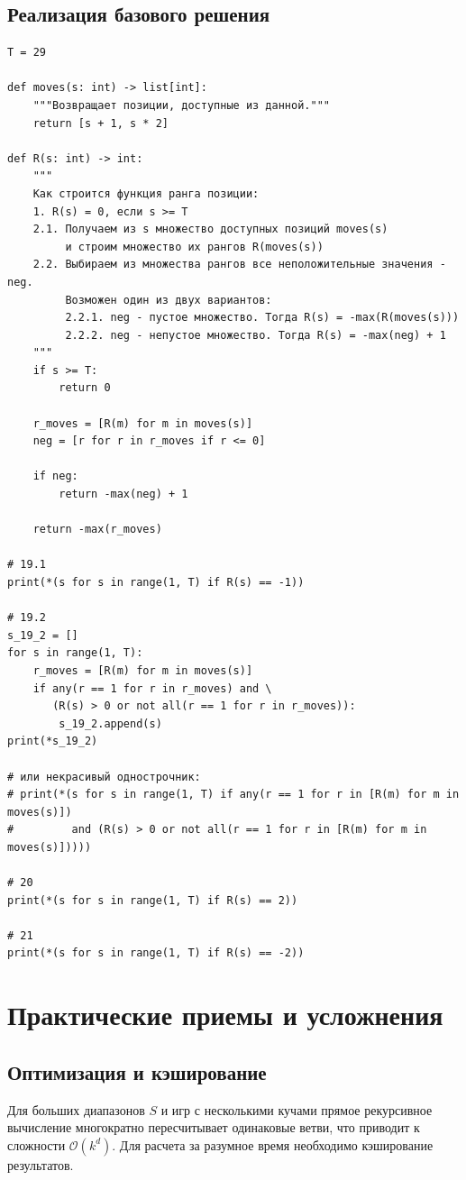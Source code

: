 \documentclass[11pt,a4paper]{article}
\begin{document}
\subsection{Реализация базового решения}
\begin{verbatim}
T = 29

def moves(s: int) -> list[int]:
    """Возвращает позиции, доступные из данной."""
    return [s + 1, s * 2]

def R(s: int) -> int:
    """
    Как строится функция ранга позиции:
    1. R(s) = 0, если s >= T
    2.1. Получаем из s множество доступных позиций moves(s) 
         и строим множество их рангов R(moves(s))
    2.2. Выбираем из множества рангов все неположительные значения - neg. 
         Возможен один из двух вариантов:
         2.2.1. neg - пустое множество. Тогда R(s) = -max(R(moves(s)))
         2.2.2. neg - непустое множество. Тогда R(s) = -max(neg) + 1
    """
    if s >= T:
        return 0

    r_moves = [R(m) for m in moves(s)]
    neg = [r for r in r_moves if r <= 0]

    if neg:
        return -max(neg) + 1

    return -max(r_moves)

# 19.1
print(*(s for s in range(1, T) if R(s) == -1))

# 19.2
s_19_2 = []
for s in range(1, T):
    r_moves = [R(m) for m in moves(s)]
    if any(r == 1 for r in r_moves) and \
       (R(s) > 0 or not all(r == 1 for r in r_moves)):
        s_19_2.append(s)
print(*s_19_2)

# или некрасивый однострочник:
# print(*(s for s in range(1, T) if any(r == 1 for r in [R(m) for m in moves(s)]) 
#         and (R(s) > 0 or not all(r == 1 for r in [R(m) for m in moves(s)]))))

# 20
print(*(s for s in range(1, T) if R(s) == 2))

# 21
print(*(s for s in range(1, T) if R(s) == -2))
\end{verbatim}

\section{Практические приемы и усложнения}

\subsection{Оптимизация и кэширование}

Для больших диапазонов $S$ и игр с несколькими кучами прямое рекурсивное вычисление многократно пересчитывает одинаковые ветви, что приводит к сложности $\mathcal{O}(k^d)$. Для расчета за разумное время необходимо кэширование результатов.
\end{document}
